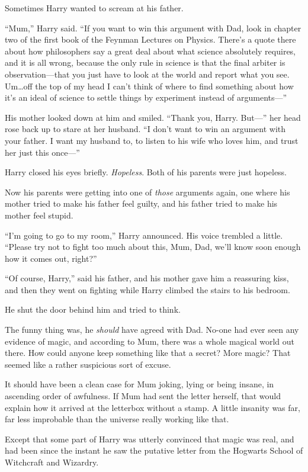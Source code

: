 Sometimes Harry wanted to scream at his father.

“Mum,” Harry said. “If you want to win this argument with Dad, look in chapter two of the first book of the Feynman Lectures on Physics. There’s a quote there about how philosophers say a great deal about what science absolutely requires, and it is all wrong, because the only rule in science is that the final arbiter is observation—that you just have to look at the world and report what you see. Um…off the top of my head I can’t think of where to find something about how it’s an ideal of science to settle things by experiment instead of arguments—”

His mother looked down at him and smiled. “Thank you, Harry. But—” her head rose back up to stare at her husband. “I don’t want to win an argument with your father. I want my husband to, to listen to his wife who loves him, and trust her just this once—”

Harry closed his eyes briefly. \emph{Hopeless}. Both of his parents were just hopeless.

Now his parents were getting into one of \emph{those} arguments again, one where his mother tried to make his father feel guilty, and his father tried to make his mother feel stupid.

“I’m going to go to my room,” Harry announced. His voice trembled a little. “Please try not to fight too much about this, Mum, Dad, we’ll know soon enough how it comes out, right?”

“Of course, Harry,” said his father, and his mother gave him a reassuring kiss, and then they went on fighting while Harry climbed the stairs to his bedroom.

He shut the door behind him and tried to think.

The funny thing was, he \emph{should} have agreed with Dad. No-one had ever seen any evidence of magic, and according to Mum, there was a whole magical world out there. How could anyone keep something like that a secret? More magic? That seemed like a rather suspicious sort of excuse.

It should have been a clean case for Mum joking, lying or being insane, in ascending order of awfulness. If Mum had sent the letter herself, that would explain how it arrived at the letterbox without a stamp. A little insanity was far, far less improbable than the universe really working like that.

Except that some part of Harry was utterly convinced that magic was real, and had been since the instant he saw the putative letter from the Hogwarts School of Witchcraft and Wizardry.

